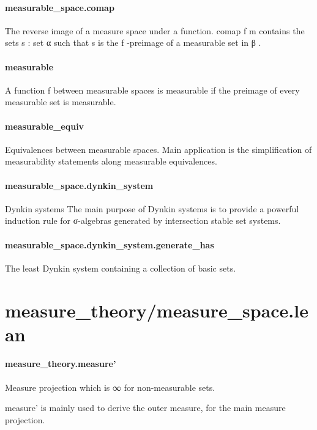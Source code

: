 \documentclass{article}
\begin{document}
\paragraph{measurable\_space.comap}
\par
The reverse image of a measure space under a function. 
\colorbox[RGB]{253,246,227}{{{{\color[RGB]{101, 123, 131} comap f m }}}} contains the sets 
\colorbox[RGB]{253,246,227}{{{{\color[RGB]{101, 123, 131} s : set α }}}}such that 
\colorbox[RGB]{253,246,227}{{{{\color[RGB]{101, 123, 131} s }}}} is the 
\colorbox[RGB]{253,246,227}{{{{\color[RGB]{101, 123, 131} f }}}}-preimage of a measurable set in 
\colorbox[RGB]{253,246,227}{{{{\color[RGB]{101, 123, 131} β }}}}.
\paragraph{measurable}
\par
A function 
\colorbox[RGB]{253,246,227}{{{{\color[RGB]{101, 123, 131} f }}}} between measurable spaces is measurable if the preimage of every
measurable set is measurable.
\paragraph{measurable\_equiv}
\par
Equivalences between measurable spaces. Main application is the simplification of measurability
statements along measurable equivalences.
\paragraph{measurable\_space.dynkin\_system}
\par
Dynkin systems
The main purpose of Dynkin systems is to provide a powerful induction rule for σ-algebras generated
by intersection stable set systems.
\paragraph{measurable\_space.dynkin\_system.generate\_has}
\par
The least Dynkin system containing a collection of basic sets.
\section{measure\_theory/measure\_space.lean}\paragraph{measure\_theory.measure'}
\par
Measure projection which is ∞ for non-measurable sets.
\par
\colorbox[RGB]{253,246,227}{{{{\color[RGB]{101, 123, 131} measure' }}}} is mainly used to derive the outer measure, for the main 
\colorbox[RGB]{253,246,227}{{{{\color[RGB]{101, 123, 131} measure }}}} projection.
\end{document}
